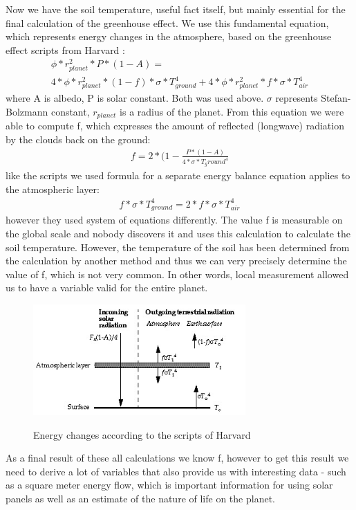 \documentclass{cfp}
\begin{document}
\par Now we have the soil temperature, useful fact itself, but mainly essential for the final calculation of the greenhouse effect. We use this fundamental equation, which represents energy changes in the atmosphere, based on the greenhouse effect scripts from Harvard \cite{Jacob}:
\begin{align}
\phi*r_{planet}^2*P*(1-A) = \\ 4*\phi*r_{planet}^2*(1-f)*\sigma*T_{ground}^4 + 4*\phi*r_{planet}^2*f*\sigma*T_{air}^4
\end{align}
where A is albedo, P is solar constant. Both was used above. $\sigma$ represents Stefan-Bolzmann constant, $r_{planet}$ is a radius of the planet. From this equation we were able to compute f, which expresses the amount of reflected (longwave) radiation by the clouds back on the ground:
\begin{align}
 f = 2*(1-\frac{P*(1-A)}{4*\sigma*T_ground^4}
\end{align}
like the scripts we used formula for a separate energy balance equation applies to the atmospheric layer:
\begin{align}
f*\sigma*T_{ground}^4 = 2*f*\sigma*T_{air}^4
\end{align}
however they used system of equations differently. The value f is measurable on the global scale and nobody discovers it and uses this calculation to calculate the soil temperature. However, the temperature of the soil has been determined from the calculation by another method and thus we can very precisely determine the value of f, which is not very common. In other words, local measurement allowed us to have a variable valid for the entire planet.\par
\begin{figure}[!h]
\centering
\caption{Energy changes according to the scripts of Harvard}\cite{Jacob}
\includegraphics[width=230pt]{bookchap7-25.jpg}
\end{figure}
As a final result of these all calculations we know f, however to get this result we need to derive a lot of variables that also provide us with interesting data - such as a square meter energy flow, which is important information for using solar panels as well as an estimate of the nature of life on the planet.
\end{document}
